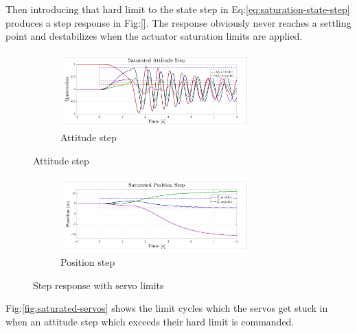 \par
Then introducing that hard limit to the state step in Eq:\ref{eq:saturation-state-step} produces a step response in Fig:\ref{}. The response obviously never reaches a settling point and destabilizes when the actuator saturation limits are applied.
\begin{figure}[hbtp]
\vspace{-12pt}
\centering
\begin{subfigure}{\textwidth}
\centering
\includegraphics[width=0.8\textwidth]{graphs/saturated-attitude-step}
\vspace{-10pt}
\caption{Attitude step}
\vspace{-16pt}
\end{subfigure}
\vspace{-24pt}
\end{figure}
\newpage
\begin{figure}\ContinuedFloat
\vspace{-8pt}
\centering
\begin{subfigure}{\textwidth}
\centering
\includegraphics[width=0.8\textwidth]{graphs/saturated-position-step}
\vspace{-10pt}
\caption{Position step}
\end{subfigure}
\vspace{-6pt}
\caption{Step response with servo limits}
\vspace{-18pt}
\end{figure}
\par
Fig:\ref{fig:saturated-servos} shows the limit cycles which the servos get stuck in when an attitude step which exceeds their hard limit is commanded.

